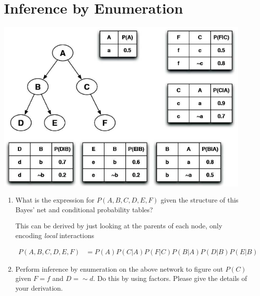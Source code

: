 \documentclass[12pt]{article}
\begin{document}
\clearpage

\section{Inference by Enumeration}

\begin{center}
\includegraphics[width=5in]{prob2.png}
\end{center}

\begin{enumerate}

\item What is the expression for $P(A,B,C,D,E,F)$ given the structure
  of this Bayes' net and conditional probability tables?

This can be derived by just looking at the parents of each node, only encoding {\em local} interactions

\vspace{-2em}
\begin{align*}
  P(A,B,C,D,E,F) &= P(A)P(C|A)P(F|C)P(B|A)P(D|B)P(E|B)
\end{align*}

\item Perform inference by enumeration on the above network to figure
  out $P(C)$ given $F=f$ and $D= \sim d$.  Do this by using factors.
  Please give the details of your derivation.

\end{enumerate}
\end{document}
